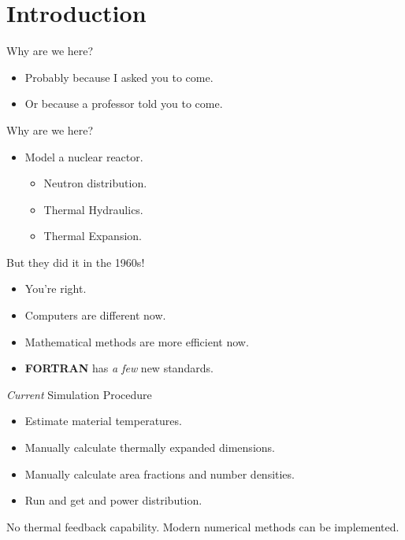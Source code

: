 \section{Introduction}
\label{sec:introduction}

\begin{frame}{Why are we here?}
  \pause
  \begin{itemize}
    \item Probably because I asked you to come.
    \item Or because a professor told you to come.
  \end{itemize}
\end{frame}

\begin{frame}{Why are we here?}
  \begin{itemize}
    \item {\huge Model a nuclear reactor.}
      \pause
      \begin{itemize}
        \item Neutron distribution.
        \item Thermal Hydraulics.
        \item Thermal Expansion.
      \end{itemize}
  \end{itemize}
\end{frame}

\begin{frame}{But they did it in the 1960s!}
  \begin{itemize}
    \pause 
    \item You're right.
    \pause
    \item Computers are different now.
    \item Mathematical methods are more efficient now.
    \item \textbf{FORTRAN} has \textit{a few} new standards.
  \end{itemize}
\end{frame}

\begin{frame}{\textit{Current} Simulation Procedure}
  \begin{itemize}
    \item Estimate material temperatures.
    \item Manually calculate thermally expanded dimensions.
    \item Manually calculate area fractions and number densities.
    \item Run \dif and get \keff and power distribution.
    \pause
  \end{itemize}
  \vspace{0.3in}
  \begin{block}{}
    No thermal feedback capability. Modern numerical methods can be
    implemented.
  \end{block}
\end{frame}

